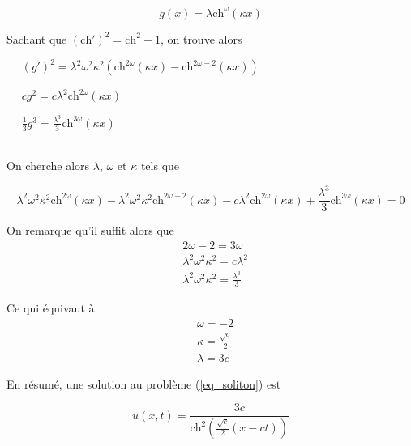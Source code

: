 \documentclass[12pt,a4paper]{article}
\numberwithin{equation}{section}
\begin{document}
\begin{equation*}
     g(x) = \lambda\text{ch}^{\omega}(\kappa x)
\end{equation*}

Sachant que $(\text{ch}')^2 = \text{ch}^2 - 1$, on trouve alors
\begin{list}{}{}
    \item[\textbullet]~~ $(g')^2 = \lambda^2\omega^2\kappa^2\left( \text{ch}^{2\omega}(\kappa x) - \text{ch}^{2\omega-2}(\kappa x)\right)$
    \item[\textbullet]~~ $cg^2 = c \lambda^2\text{ch}^{2\omega}(\kappa x)$
    \item[\textbullet]~~ $\frac{1}{3}g^3 = \frac{\lambda^3}{3}\text{ch}^{3\omega}(\kappa x)$
    
\end{list}\,\\

On cherche alors $\lambda$, $\omega$ et $\kappa$ tels que

\begin{equation*}
    \lambda^2\omega^2\kappa^2 \text{ch}^{2\omega}(\kappa x) - \lambda^2\omega^2\kappa^2 \text{ch}^{2\omega-2}(\kappa x) - c \lambda^2\text{ch}^{2\omega}(\kappa x) + \frac{\lambda^3}{3}\text{ch}^{3\omega}(\kappa x) = 0
\end{equation*}

On remarque qu'il suffit alors que 
\begin{align*}
    & 2\omega - 2 = 3\omega\\
    &\lambda^2\omega^2\kappa^2= c\lambda^2 \\ 
    & \lambda^2\omega^2\kappa^2 = \frac{\lambda^3}{3}
\end{align*}

Ce qui équivaut à
\begin{align*}
    &\omega = -2\\
    &\kappa = \frac{\sqrt{c}}{2}\\
    &\lambda = 3c
\end{align*}

En résumé, une solution au problème (\ref{eq_soliton}) est

\begin{equation}
    u(x,t) = \frac{3c}{\text{ch}^2\left( \frac{\sqrt{c}}{2}(x-ct)\right)}
\end{equation}
\newpage
\nocite{MT}
\nocite{Lannes}
\printbibliography
\end{document}
